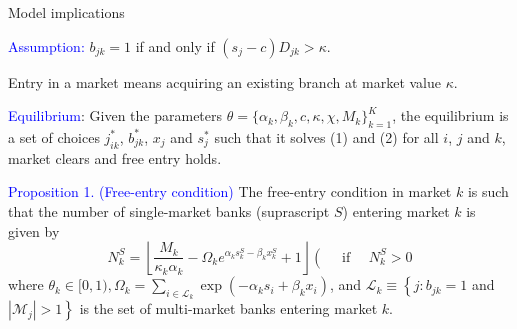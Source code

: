 \documentclass[notes,10pt, aspectratio=169]{beamer}
\newenvironment{wideitemize}{\itemize\addtolength{\itemsep}{10pt}}{\enditemize}
\begin{document}
            
            \begin{frame}{Model implications}
            
                \begin{wideitemize}
                    \item \textcolor{blue}{Assumption:} $b_{jk} = 1$ if and only if $(s_j -c)D_{jk} >\kappa $.
                    \item Entry in a market means acquiring an existing branch at market value $\kappa$.
                    \item \textcolor{blue}{Equilibrium}: Given the parameters $\theta = \{\alpha_k, \beta_k, c, \kappa, \chi, M_k\}_{k=1}^K$, the equilibrium is a set of choices $j_{ik}^*$, $b_{jk}^*$, $x_j$ and $s_j^*$ such that it solves (1) and (2) for all $i$, $j$ and $k$, market clears and free entry holds.
                    \item \textcolor{blue}{Proposition 1. (Free-entry condition)} 
                    The free-entry condition in market $k$ is such that the number of single-market banks (suprascript $S$) entering market $k$ is given by
                    $$
                    N_k^S=\left\lfloor\frac{M_k}{\kappa_k \alpha_k}-\Omega_k e^{\alpha_k s_k^S-\beta_k x_k^S}+1\right\rfloor\left(\quad \text { if } \quad N_k^S>0\right.
                    $$
                    where $\theta_k \in[0,1), \Omega_k=\sum_{i \in \mathcal{ L}_k} \exp \left(-\alpha_k s_i+\beta_k x_i\right)$, and $\mathcal{L}_k \equiv\left\{j: b_{j k}=1\right.$ and $\left.\left|\mathcal{M}_j\right|>1\right\}$ is the set of multi-market banks entering market $k$.


                \end{wideitemize}
                
                
            
            \end{frame}
\end{document}
